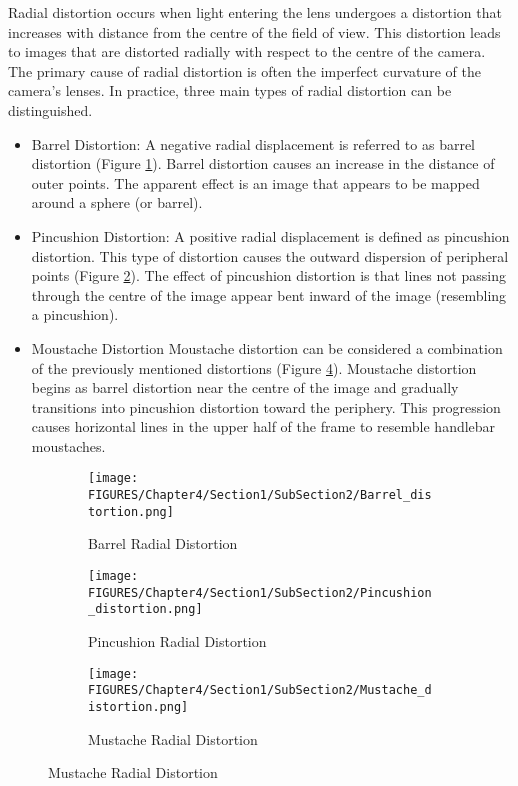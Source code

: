 Radial distortion occurs when light entering the lens undergoes a distortion that increases with distance from the centre of the field of view. This distortion leads to images that are distorted radially with respect to the centre of the camera. 
The primary cause of radial distortion is often the imperfect curvature of the camera’s lenses. In practice, three main types of radial distortion can be distinguished.

\begin{itemize}
  \item Barrel Distortion:
A negative radial displacement is referred to as barrel distortion (Figure \ref{fig:barrel_distortion}). Barrel distortion causes an increase in the distance of outer points. The apparent effect is an image that appears to be mapped around a sphere (or barrel).
  \item Pincushion Distortion:
A positive radial displacement is defined as pincushion distortion.
This type of distortion causes the outward dispersion of peripheral points (Figure \ref{fig:pincushion_distortion}).
The effect of pincushion distortion is that lines not passing through the centre of the image appear bent inward of the image (resembling a pincushion).
  \item Moustache  Distortion
Moustache distortion can be considered a combination of the previously mentioned distortions (Figure \ref{fig:mustache_distortion}). Moustache distortion begins as barrel distortion near the centre of the image and gradually transitions into pincushion distortion toward the periphery. This progression causes horizontal lines in the upper half of the frame to resemble handlebar moustaches.
\end{itemize}

\begin{figure}[htbp]
  \centering
  \begin{subfigure}[b]{0.3\textwidth}
      \centering
      \texttt{[image: FIGURES/Chapter4/Section1/SubSection2/Barrel\_distortion.png]}
      \caption{Barrel Radial Distortion}
      \label{fig:barrel_distortion}
  \end{subfigure}
  \hfill
  \begin{subfigure}[b]{0.3\textwidth}
      \centering
      \texttt{[image: FIGURES/Chapter4/Section1/SubSection2/Pincushion\_distortion.png]}
      \caption{Pincushion Radial Distortion}
      \label{fig:pincushion_distortion}
  \end{subfigure}
  \hfill
  \begin{subfigure}[b]{0.3\textwidth}
      \centering
      \texttt{[image: FIGURES/Chapter4/Section1/SubSection2/Mustache\_distortion.png]}
      \caption{Mustache Radial Distortion}
      \label{fig:mustache_distortion}
  \end{subfigure}
\end{figure}

